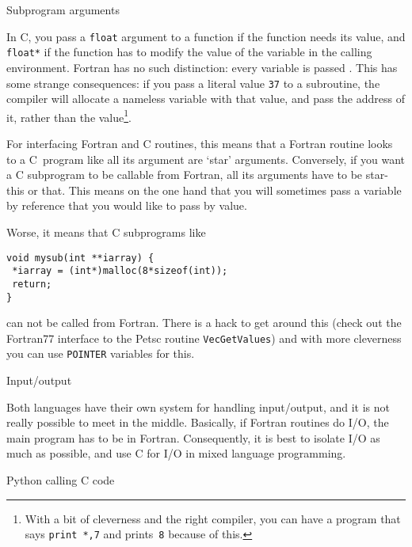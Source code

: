  {Subprogram arguments}

In C, you pass a \texttt{float} argument to a function if the function
needs its value, and \texttt{float*} if the function has to modify the
value of the variable in the calling environment. Fortran has no such
distinction: every variable is passed . This
has some strange consequences: if you pass a literal value
\texttt{37} to a subroutine, the compiler will allocate a nameless
variable with that value, and pass the address of it, rather than the
value\footnote{With a bit of cleverness and the right compiler, you
  can have a program that says \texttt{print *,7} and
  prints~\texttt{8} because of this.}.

For interfacing Fortran and C routines, this means that a Fortran
routine looks to a C~program like all its argument are `star'
arguments. Conversely, if you want a C subprogram to be callable from
Fortran, all its arguments have to be star-this or that. This means on
the one hand that you will sometimes pass a variable by reference that
you would like to pass by value.

Worse, it means that C subprograms like
\begin{verbatim}
void mysub(int **iarray) {
 *iarray = (int*)malloc(8*sizeof(int));
 return;
}
\end{verbatim}
can not be called from Fortran. There is a hack to get around this
(check out the Fortran77 interface to the Petsc routine
\texttt{VecGetValues}) and with more cleverness you can use
\texttt{POINTER} variables for this.

 {Input/output}

Both languages have their own system for handling input/output, and it
is not really possible to meet in the middle. Basically, if Fortran
routines do I/O, the main program has to be in Fortran. Consequently,
it is best to isolate I/O as much as possible, and use C for I/O in
mixed language programming.

 {Python calling C code}


